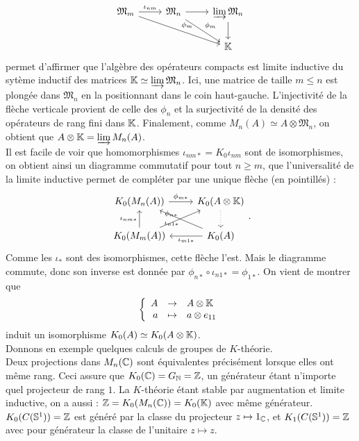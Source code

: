 \[\begin{tikzcd}
\mathfrak M_m \arrow{r}{\iota_{nm}} \arrow{drr}{\phi_m}& \mathfrak M_n \arrow{r} \arrow{dr}{\phi_m}& \varinjlim \mathfrak M_n \arrow{d} \\
				&				& \K
\end{tikzcd}\]
permet d'affirmer que l'algèbre des opérateurs compacts est limite inductive  du sytème inductif des matrices $\mathbb K \simeq \varinjlim \mathfrak M_n$. Ici, une matrice de taille $m\leq n$ est plongée dans $\mathfrak M_n$ en la positionnant dans le coin haut-gauche. L'injectivité de la flèche verticale provient de celle des $\phi_n$ et la surjectivité de la densité des opérateurs de rang fini dans $\mathbb K$. Finalement, comme $M_n(A) \simeq A\otimes \mathfrak M_n$, on obtient que $A\otimes \mathbb K = \varinjlim M_n(A)$.\\
Il est facile de voir que homomorphismes $\iota_{nm*}=K_0\iota_{nm}$ sont de isomorphismes, on obtient ainsi un diagramme commutatif pour tout $n\geq m$, que l'universalité de la limite inductive permet de compléter par une unique flèche (en pointillés) :
\[\begin{tikzcd}K_0(M_n(A)) \arrow{r}{\phi_{m*}}& K_0(A\otimes \K)\arrow[dotted]{d} \\
			K_0(M_m(A)) \arrow{u}{\iota_{nm*}}\arrow{ur}{\phi_{n*}}& K_0(A)   \arrow{l}{\iota_{m1 *}}\arrow{ul }{\iota_{n1*}}
\end{tikzcd}.\]
Comme les $\iota_*$ sont des isomorphismes, cette flèche l'est. Mais le diagramme commute, donc son inverse est donnée par $\phi_{n*}\circ\iota_{n1*}=\phi_{1*}$. On vient de montrer que 
\[\left\{\begin{array}{rcl} A & \rightarrow & A\otimes \mathbb K \\ a &\mapsto & a\otimes e_{11}\end{array}\right.\]
induit un isomorphisme $K_0(A)\simeq K_0(A\otimes \mathbb K)$.\\

Donnons en exemple quelques calculs de groupes de $K$-théorie. \\
Deux projections dans $M_n(\mathbb C)$ sont équivalentes précisément lorsque elles ont même rang. Ceci assure que $K_0(\mathbb C)=G_{\mathbb N}=\mathbb Z$, un générateur étant n'importe quel projecteur de rang $1$. La $K$-théorie étant stable par augmentation et limite inductive, on a aussi : $\mathbb Z=K_0(M_n(\mathbb C))=K_0(\mathbb K)$ avec même générateur. \\
$K_0(C(\mathbb S^1))=\mathbb Z$ est généré par la classe du projecteur $z\mapsto 1_\mathbb C$, et $K_1(C(\mathbb S^1))=\mathbb Z$ avec pour générateur la classe de l'unitaire $z\mapsto  z$. \\

